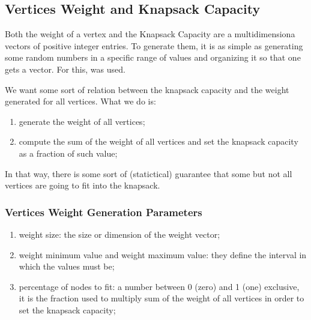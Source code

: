 \subsection{Vertices Weight and Knapsack Capacity}

Both the weight of a vertex and the Knapsack Capacity are a multidimensiona vectors of positive integer entries. To generate them, it is as simple as generating some random numbers in a specific range of values and organizing it so that one gets a vector. For this, \cite{bib:numpy} was used.

We want some sort of relation between the knapsack capacity and the weight generated for all vertices. What we do is:

\begin{enumerate}
    \item generate the weight of all vertices;
    \item compute the sum of the weight of all vertices and set the knapsack capacity as a fraction of such value;
\end{enumerate}

In that way, there is some sort of (statictical) guarantee that some but not all vertices are going to fit into the knapsack.

\subsubsection{Vertices Weight Generation Parameters}

\begin{enumerate}
    \item weight size: the size or dimension of the weight vector;
    \item weight minimum value and weight maximum value: they define the interval in which the values must be;
    \item percentage of nodes to fit: a number between 0 (zero) and 1 (one) exclusive, it is the fraction used to multiply sum of the weight of all vertices in order to set the knapsack capacity;
\end{enumerate}

